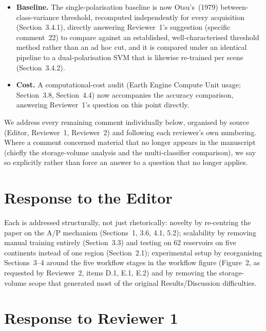 \documentclass[11pt]{article}
\begin{document}
\begin{itemize}[leftmargin=1.2em]
  of the 62-reservoir global comparison against the JRC Global Surface Water
  record (Sections~2, 3.7), rather than as the study's only validation.
  \item \textbf{Baseline.} The single-polarisation baseline is now
  Otsu's~(1979) between-class-variance threshold, recomputed independently
  for every acquisition (Section~3.4.1), directly answering Reviewer~1's
  suggestion (specific comment~22) to compare against an established,
  well-characterised threshold method rather than an ad hoc cut, and it is
  compared under an identical pipeline to a dual-polarisation SVM that is
  likewise re-trained per scene (Section~3.4.2).
  \item \textbf{Cost.} A computational-cost audit (Earth Engine Compute Unit
  usage; Section~3.8, Section~4.4) now accompanies the accuracy comparison,
  answering Reviewer~1's question on this point directly.
\end{itemize}

We address every remaining comment individually below, organised by source
(Editor, Reviewer~1, Reviewer~2) and following each reviewer's own numbering.
Where a comment concerned material that no longer appears in the manuscript
(chiefly the storage-volume analysis and the multi-classifier comparison), we
say so explicitly rather than force an answer to a question that no longer
applies.

\section*{Response to the Editor}

\begin{resp}
  \item[Novelty, scalability, experimental setup.] Each is addressed
  structurally, not just rhetorically: novelty by re-centring the paper on
  the A/P mechanism (Sections~1, 3.6, 4.1, 5.2); scalability by removing
  manual training entirely (Section~3.3) and testing on 62 reservoirs on five
  continents instead of one region (Section~2.1); experimental setup by
  reorganising Sections~3--4 around the five workflow stages in
  the workflow figure (Figure~2, as requested by Reviewer~2, items D.1, E.1, E.2)
  and by removing the storage-volume scope that generated most of the
  original Results/Discussion difficulties.
\end{resp}

\section*{Response to Reviewer 1}
\end{document}
